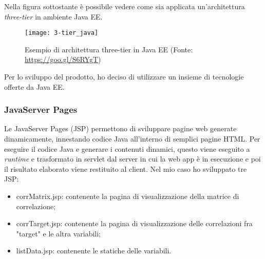 Nella figura sottostante è possibile vedere come sia applicata un'architettura \textit{three-tier} in ambiente Java EE.
\begin{figure}[!h]
	\centering
	\texttt{[image: 3-tier\_java]}
	\caption{Esempio di architettura three-tier in Java EE (Fonte: \href{https://goo.gl/S6RYgT}{https://goo.gl/S6RYgT})}
\end{figure}

Per lo sviluppo del prodotto, ho deciso di utilizzare un insieme di tecnologie offerte da Java EE.
\subsubsection{JavaServer Pages}
Le JavaServer Pages (JSP) permettono di sviluppare pagine web generate dinamicamente, innestando codice Java all'interno di semplici pagine HTML. Per eseguire il codice Java e generare i contenuti dinamici, questo viene eseguito a \textit{runtime} e trasformato in servlet dal server in cui la \gls{web app} è in esecuzione e poi il risultato elaborato viene restituito al client.
Nel mio caso ho sviluppato tre JSP:
\begin{itemize}
	\item corrMatrix.jsp: contenente la pagina di visualizzazione della matrice di correlazione;
	\item corrTarget.jsp: contenente la pagina di visualizzazione delle correlazioni fra "target" e le altra variabili;
	\item listData.jsp: contenente le statiche delle variabili.
\end{itemize}
